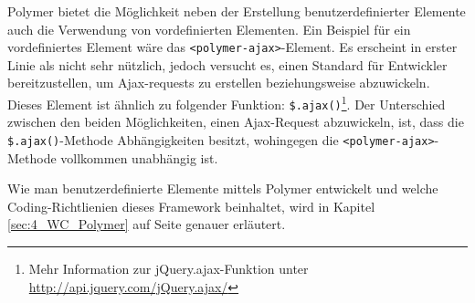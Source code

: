 Polymer bietet die Möglichkeit neben der Erstellung benutzerdefinierter Elemente auch die Verwendung von vordefinierten Elementen. Ein Beispiel für ein vordefiniertes Element wäre das \lstinline|<polymer-ajax>|-Element. Es erscheint in erster Linie als nicht sehr nützlich, jedoch versucht es, einen Standard für Entwickler bereitzustellen, um Ajax-requests zu erstellen beziehungsweise abzuwickeln. Dieses Element ist ähnlich zu folgender Funktion: \lstinline{$.ajax()}\footnote{Mehr Information zur jQuery.ajax-Funktion unter \href{http://api.jquery.com/jQuery.ajax/}{http://api.jquery.com/jQuery.ajax/}}. Der Unterschied zwischen den beiden Möglichkeiten, einen Ajax-Request abzuwickeln, ist, dass die \lstinline{$.ajax()}-Methode Abhängigkeiten besitzt, wohingegen die \lstinline|<polymer-ajax>|-Methode vollkommen unabhängig ist.

Wie man benutzerdefinierte Elemente mittels Polymer entwickelt und welche Coding-Richtlienien dieses Framework beinhaltet, wird in Kapitel \ref{sec:4_WC_Polymer} auf Seite \pageref{sec:4_WC_Polymer} genauer erläutert.